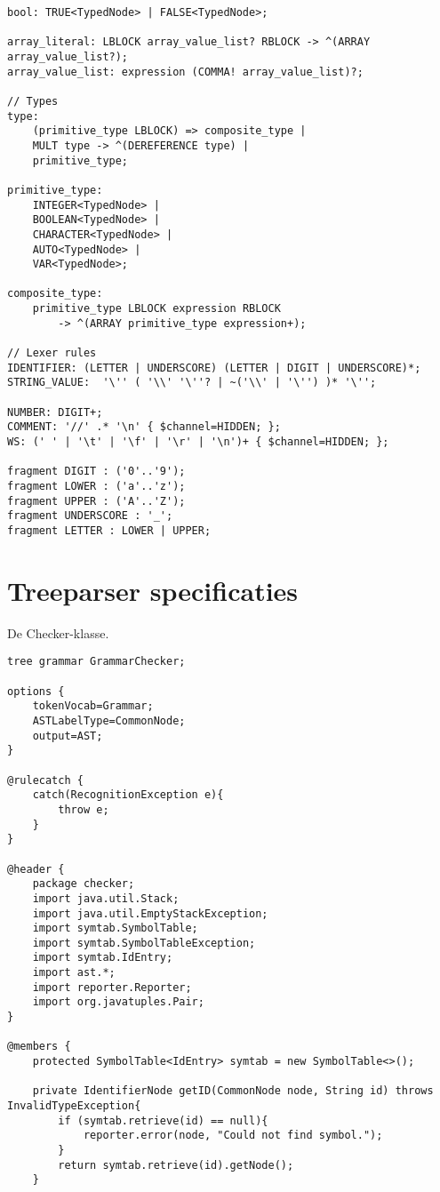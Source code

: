 \begin{landscape}
\begin{lstlisting}
bool: TRUE<TypedNode> | FALSE<TypedNode>;

array_literal: LBLOCK array_value_list? RBLOCK -> ^(ARRAY array_value_list?);
array_value_list: expression (COMMA! array_value_list)?;

// Types
type:
    (primitive_type LBLOCK) => composite_type |
    MULT type -> ^(DEREFERENCE type) |
    primitive_type;

primitive_type:
    INTEGER<TypedNode> |
    BOOLEAN<TypedNode> |
    CHARACTER<TypedNode> |
    AUTO<TypedNode> |
    VAR<TypedNode>;

composite_type:
    primitive_type LBLOCK expression RBLOCK
        -> ^(ARRAY primitive_type expression+);

// Lexer rules
IDENTIFIER: (LETTER | UNDERSCORE) (LETTER | DIGIT | UNDERSCORE)*;
STRING_VALUE:  '\'' ( '\\' '\''? | ~('\\' | '\'') )* '\'';

NUMBER: DIGIT+;
COMMENT: '//' .* '\n' { $channel=HIDDEN; };
WS: (' ' | '\t' | '\f' | '\r' | '\n')+ { $channel=HIDDEN; };

fragment DIGIT : ('0'..'9');
fragment LOWER : ('a'..'z');
fragment UPPER : ('A'..'Z');
fragment UNDERSCORE : '_';
fragment LETTER : LOWER | UPPER;
\end{lstlisting}
\section{Treeparser specificaties} %
\label{sec:treeparser_specificaties}

De Checker-klasse.
\begin{lstlisting}
tree grammar GrammarChecker;

options {
    tokenVocab=Grammar;
    ASTLabelType=CommonNode;
    output=AST;
}

@rulecatch {
    catch(RecognitionException e){
        throw e;
    }
}

@header {
    package checker;
    import java.util.Stack;
    import java.util.EmptyStackException;
    import symtab.SymbolTable;
    import symtab.SymbolTableException;
    import symtab.IdEntry;
    import ast.*;
    import reporter.Reporter;
    import org.javatuples.Pair;
}

@members {
    protected SymbolTable<IdEntry> symtab = new SymbolTable<>();

    private IdentifierNode getID(CommonNode node, String id) throws InvalidTypeException{
        if (symtab.retrieve(id) == null){
            reporter.error(node, "Could not find symbol.");
        }
        return symtab.retrieve(id).getNode();
    }


\end{lstlisting}
\end{landscape}
